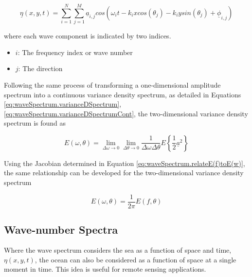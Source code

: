 \begin{equation} \label{eq:waveSpectrum.fourierSeries_3D}
    \underline{\eta}(x,y,t) = \sum_{i=1}^{N} \sum_{j=1}^{M} \underline{a}_{i,j}cos(\omega_{i}t-k_{i}xcos(\theta_{j}) - k_{i}ysin(\theta_{j}) + \underline{\phi}_{i,j})
\end{equation}

where each wave component is indicated by two indices.
\begin{itemize}
    \item $i$: The frequency index or wave number
    \item $j$: The direction
\end{itemize}

Following the same process of transforming a one-dimensional amplitude spectrum into a continuous variance density spectrum, as detailed in Equations \ref{eq:waveSpectrum.varianceDSpectrum}, \ref{eq:waveSpectrum.varianceDSpectrumCont}, the two-dimensional variance density spectrum is found as

\begin{equation} \label{eq:waveSpectrum.varianceDSpectrumCont_2D}
    E(\omega,\theta) =  \lim_{\Delta \omega \to 0}\lim_{\Delta \theta \to 0}\frac{1}{\Delta \omega \Delta \theta} E\left \{ \frac{1}{2} \underline{a}^{2}\right \}
\end{equation}

Using the Jacobian determined in Equation \ref{eq:waveSpectrum.relateE(f)toE(w)}, the same relationship can be developed for the two-dimensional variance density spectrum

\begin{equation} \label{eq:waveSpectrum.relateE(f)toE(w)_2D}
    E(\omega,\theta) =  \frac{1}{2\pi}E(f,\theta)
\end{equation}

\subsection{Wave-number Spectra} \label{subsec:theory.waves.waveNumberSpectra}
Where the wave spectrum considers the sea as a function of space and time, $\eta(x,y,t)$, the ocean can also be considered as a function of space at a single moment in time. This idea is useful for remote sensing applications.


